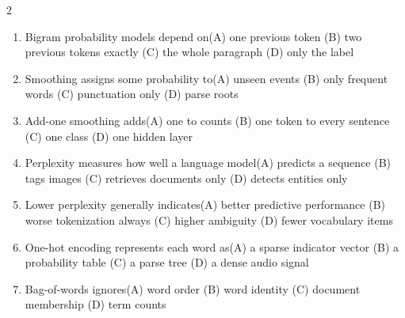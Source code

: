 \documentclass[a4paper]{article}
\begin{document}
\begin{multicols*}{2}
\begin{enumerate}
\item Bigram probability models depend on\newline\hspace*{0.6em}(A) one previous token \quad (B) two previous tokens exactly \newline\hspace*{0.6em}(C) the whole paragraph \quad (D) only the label
\item Smoothing assigns some probability to\newline\hspace*{0.6em}(A) unseen events \quad (B) only frequent words \newline\hspace*{0.6em}(C) punctuation only \quad (D) parse roots
\item Add-one smoothing adds\newline\hspace*{0.6em}(A) one to counts \quad (B) one token to every sentence \newline\hspace*{0.6em}(C) one class \quad (D) one hidden layer
\item Perplexity measures how well a language model\newline\hspace*{0.6em}(A) predicts a sequence \quad (B) tags images \newline\hspace*{0.6em}(C) retrieves documents only \quad (D) detects entities only
\item Lower perplexity generally indicates\newline\hspace*{0.6em}(A) better predictive performance \quad (B) worse tokenization always \newline\hspace*{0.6em}(C) higher ambiguity \quad (D) fewer vocabulary items
\item One-hot encoding represents each word as\newline\hspace*{0.6em}(A) a sparse indicator vector \quad (B) a probability table \newline\hspace*{0.6em}(C) a parse tree \quad (D) a dense audio signal
\item Bag-of-words ignores\newline\hspace*{0.6em}(A) word order \quad (B) word identity \newline\hspace*{0.6em}(C) document membership \quad (D) term counts

\end{enumerate}
\end{multicols*}
\end{document}
